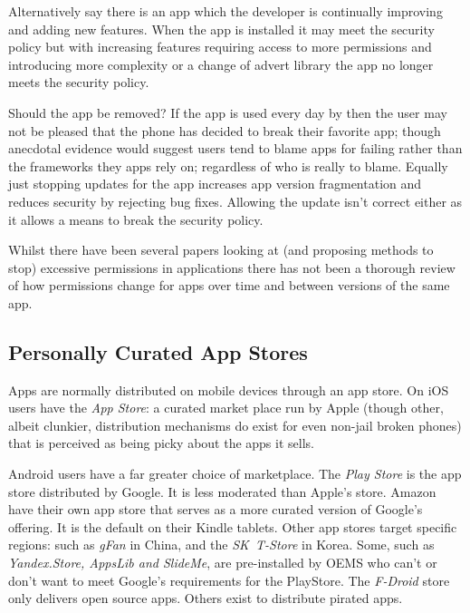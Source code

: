 \documentclass[a4paper,sfsidenotes]{tufte-book}
\begin{document}
Alternatively say there is an app which the developer is continually improving
and adding new features.  When the app is installed it may meet the security
policy but with increasing features requiring access to more permissions and
introducing more complexity or a change of advert library the app no longer
meets the security policy.

Should the app be removed?  If the app is used every day by then the user may
not be pleased that the phone has decided to break their favorite
app; though anecdotal evidence would suggest users tend to blame apps
  for failing rather than the frameworks they apps rely on; regardless of who is
  really to blame. Equally just stopping updates for the app increases app
version fragmentation and reduces security by rejecting bug fixes.  Allowing the
update isn't correct either as it allows a means to break the security policy.

Whilst there have been several papers looking at (and proposing methods to stop)
excessive permissions in applications\cite{Felt:2011kj}\cite{Vidas:2011wr} there
has not been a thorough review of how permissions change for apps over time
and between versions of the same app. 



\subsection{Personally Curated App Stores}

Apps are normally distributed on mobile devices through an app
store.  On iOS users have the \emph{App Store}: a curated market place run by
Apple (though other, albeit clunkier, distribution mechanisms do exist for even
non-jail broken phones) that is perceived as being picky about the apps it sells.

Android users have a far greater choice of marketplace.  The \emph{Play Store}
is the app store distributed by Google. It is less moderated than Apple's store.
Amazon have their own app store that serves as a more curated version of
Google's offering. It is the default on their Kindle tablets.  Other app stores
target specific regions: such as \emph{gFan} in China, and the \emph{SK~T-Store}
in Korea.  Some, such as \emph{Yandex.Store, AppsLib and SlideMe}, are
pre-installed by OEMS who can't or don't want to meet Google's requirements for
the PlayStore.  The \emph{F-Droid} store only delivers open source apps. Others
exist to distribute pirated apps. 
\end{document}
